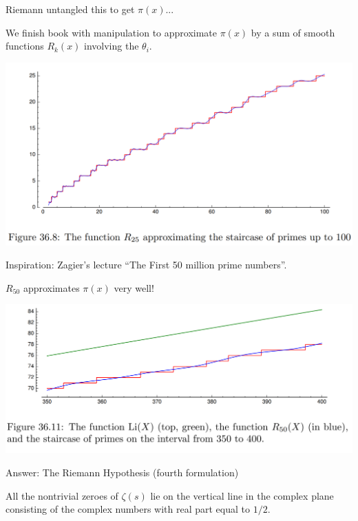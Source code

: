 \documentclass{beamer}
\begin{document}
\begin{frame}{Riemann untangled this to get $\pi(x)$...}

We finish book with manipulation to approximate $\pi(x)$
by a sum of smooth functions $R_k(x)$ involving the $\theta_i$.
\vfill

\includegraphics[height=.65\textheight]{pics/R25-approx}

\vfill
Inspiration: Zagier's lecture ``The First 50 million prime numbers''.
\end{frame}


\begin{frame}{$R_{50}$ approximates $\pi(x)$ very well!}

\includegraphics[height=.55\textheight]{pics/Li-R50-pi}

\end{frame}



\begin{frame}{Answer: The Riemann Hypothesis (fourth formulation)}
  \begin{block}{}
    All the nontrivial zeroes of $\zeta(s)$ lie on the vertical
    line in the complex plane consisting of the
    complex numbers with real part equal to $1/2$.
  \end{block}
\end{frame}
\end{document}
